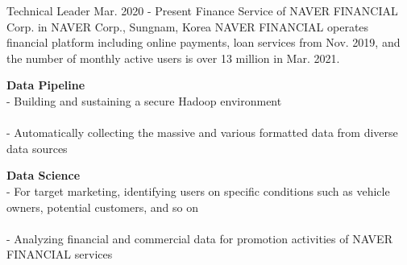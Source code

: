 

\begin{cventries}
    \cventry
        {Technical Leader} %
        {Mar. 2020 - Present} %
        {Finance Service of NAVER FINANCIAL Corp. in NAVER Corp., } %
        {Sungnam, Korea}%
        { %
            NAVER FINANCIAL operates financial platform including online payments, loan services from Nov. 2019, and the number of monthly active users is over 13 million in Mar. 2021.
        }
        { %
            \begin{cvitems}
                \item {
                    {\bf Data Pipeline} \\
                    - Building and sustaining a secure Hadoop environment \\
                         \\
                    - Automatically collecting the massive and various formatted data from diverse data sources \\
                         \nn
                }
                \item {
                    {\bf Data Science} \\
                    - For target marketing, identifying users on specific conditions such as vehicle owners, potential customers, and so on \\
                         \\
                    - Analyzing financial and commercial data for promotion activities of NAVER FINANCIAL services \\
                         \nn
                }
            \end{cvitems}
        }


\end{cventries}
